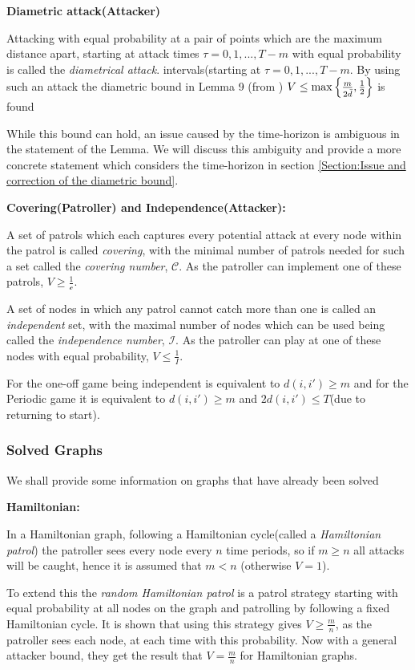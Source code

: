 \documentclass[a4paper,10pt]{article}
\theoremstyle{definition}
\theoremstyle{definition}
\theoremstyle{remark}
\theoremstyle{definition}
\begin{document}
\textbf{Diametric attack(Attacker)}

Attacking with equal probability at a pair of points which are the maximum distance apart, starting at attack times $\tau=0,1,...,T-m$ with equal probability is called the \textit{diametrical attack}. intervals(starting at $\tau=0,1,...,T-m$. By using such an attack the diametric bound in Lemma 9 (from \cite{Alpern2011}) $V \leq \max\left\{\frac{m}{\raisebox{-0.5ex}{$\scriptstyle 2 \bar{d}$}} , \frac{1}{2} \right\}$ is found


While this bound can hold, an issue caused by the time-horizon is ambiguous in the statement of the Lemma. We will discuss this ambiguity and provide a more concrete statement which considers the time-horizon in section \ref{Section:Issue and correction of the diametric bound}.

\textbf{Covering(Patroller) and Independence(Attacker):}

A set of patrols which each captures every potential attack at every node within the patrol is called  \textit{covering}, with the minimal number of patrols needed for such a set called the \textit{covering number}, $\mathcal{C}$. As the patroller can implement one of these patrols, $V \geq \frac{1}{\mathcal{c}}$.

A set of nodes in which any patrol cannot catch more than one is called  an \textit{independent} set, with the maximal number of nodes which can be used being called the \textit{independence number}, $\mathcal{I}$. As the patroller can play at one of these nodes with equal probability, $V \leq \frac{1}{I}$. 


For the one-off game being independent is equivalent to $d(i,i') \geq m$ and for the Periodic game it is equivalent to $d(i,i') \geq m$ and $2d(i,i') \leq T$(due to returning to start).

\subsubsection{Solved Graphs}
We shall provide some information on graphs that have already been solved

\textbf{Hamiltonian:}

In a Hamiltonian graph, following a Hamiltonian cycle(called a \textit{Hamiltonian patrol}) the patroller sees every node every $n$ time periods, so if $m \geq n$ all attacks will be caught, hence it is assumed that $m < n$ (otherwise $V=1$).

To extend this the \textit{random Hamiltonian patrol} is a patrol strategy starting with equal probability at all nodes on the graph and patrolling by following a fixed Hamiltonian cycle. It is shown that using this strategy gives $V \geq \frac{m}{n}$, as the patroller sees each node, at each time with this probability. Now with a general attacker bound, they get the result that $V=\frac{m}{n}$ for Hamiltonian graphs.
\end{document}
